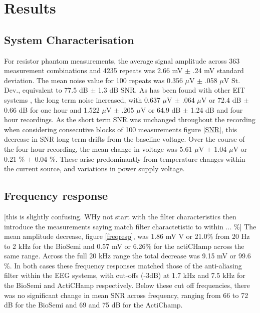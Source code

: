 \section{Results}
\subsection{System Characterisation}
For resistor phantom measurements, the average signal amplitude across 363 measurement combinations and 4235 repeats was 2.66 mV $\pm$ .24 mV standard deviation. The mean noise value for 100 repeats was 0.356 $\mu$V $\pm$ .058 $\mu$V St. Dev., equivalent to 77.5 dB $\pm$ 1.3 dB SNR. As has been found with other EIT systems \cite{oh2007multi}, the long term noise increased, with 0.637 $\mu$V $\pm$ .064 $\mu$V or 72.4 dB $\pm$ 0.66 dB for one hour and 1.522 $\mu$V $\pm$ .205 $\mu$V or 64.9 dB $\pm$ 1.24 dB and four hour recordings. As the short term SNR was unchanged throughout the recording when considering consecutive blocks of 100 measurements figure \ref{SNR}, this decrease in SNR 
long term drifts from the baseline voltage. Over the course of the four hour recording, the mean change in voltage was 5.61 $\mu$V $\pm$ 1.04 $\mu$V or 0.21 \% $\pm$ 0.04 \%. 
These arise predominantly from temperature changes within the current source, and variations in power supply voltage.

\subsection{Frequency response}
[this is slightly confusing. WHy not start with the filter characteristics then introduce the measurements saying match filter charactetistic to within ... \%] The mean amplitude decrease, figure \ref{freqresp}, was 1.86 mV V or 21.0\%  from 20 Hz to 2 kHz for the BioSemi and 0.57 mV or 6.26\% for the actiCHamp across the same range. Across the full 20 kHz range the total decrease was 9.15 mV or  99.6 \%.  In both cases these frequency responses matched those of the anti-aliasing filter within the EEG systems, with cut-offs (-3dB) at 1.7 kHz and 7.5 kHz for the BioSemi and ActiCHamp respectively. Below these cut off frequencies, there was no significant change in mean SNR across frequency, ranging from 66 to 72 dB for the BioSemi and 69 and 75 dB for the ActiChamp.  